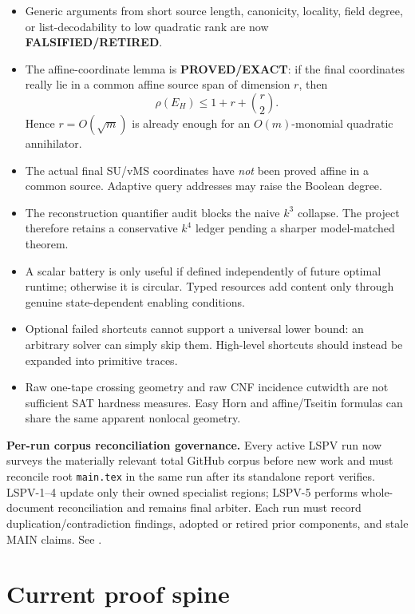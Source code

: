\documentclass[11pt]{article}
\newcommand{\statusproved}{\textcolor{proved}{\textbf{PROVED/EXACT}}}
\newcommand{\statusretired}{\textcolor{retired}{\textbf{FALSIFIED/RETIRED}}}
\begin{document}
\begin{itemize}
  \item Generic arguments from short source length, canonicity, locality, field degree, or
  list-decodability to low quadratic rank are now \statusretired.
  \item The affine-coordinate lemma is \statusproved: if the final coordinates really lie in a
  common affine source span of dimension \(r\), then
  \[
     \rho(E_H)\le 1+r+\binom{r}{2}.
  \]
  Hence \(r=O(\sqrt m)\) is already enough for an \(O(m)\)-monomial quadratic annihilator.
  \item The actual final SU/vMS coordinates have \emph{not} been proved affine in a common source.
  Adaptive query addresses may raise the Boolean degree.
  \item The reconstruction quantifier audit blocks the naive \(k^3\) collapse. The project therefore
  retains a conservative \(k^4\) ledger pending a sharper model-matched theorem.
  \item A scalar battery is only useful if defined independently of future optimal runtime; otherwise
  it is circular. Typed resources add content only through genuine state-dependent enabling conditions.
  \item Optional failed shortcuts cannot support a universal lower bound: an arbitrary solver can
  simply skip them. High-level shortcuts should instead be expanded into primitive traces.
  \item Raw one-tape crossing geometry and raw CNF incidence cutwidth are not sufficient SAT hardness
  measures. Easy Horn and affine/Tseitin formulas can share the same apparent nonlocal geometry.
\end{itemize}

\begin{candidatebox}
\textbf{Per-run corpus reconciliation governance.}
Every active LSPV run now surveys the materially relevant total GitHub corpus before new work and
must reconcile root \texttt{main.tex} in the same run after its standalone report verifies.
LSPV-1--4 update only their owned specialist regions; LSPV-5 performs whole-document reconciliation
and remains final arbiter. Each run must record duplication/contradiction findings, adopted or
retired prior components, and stale MAIN claims. See
.
\end{candidatebox}

\section{Current proof spine}
\end{document}
